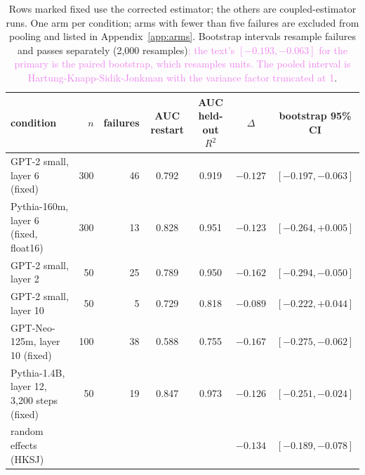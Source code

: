 \documentclass[10pt]{article}
\newcommand{\draft}[1]{\textcolor{violet}{#1}}
\begin{document}
\begin{table}[t]
\centering
\footnotesize
\setlength{\tabcolsep}{4pt}
\begin{tabular}{lrrcccc}
\toprule
condition & $n$ & failures & AUC restart & AUC held-out $R^2$ & $\Delta$ & bootstrap 95\% CI \\
\midrule
GPT-2 small, layer 6 (fixed) & 300 & 46 & 0.792 & 0.919 & $-0.127$ & $[-0.197, -0.063]$ \\
Pythia-160m, layer 6 (fixed, float16) & 300 & 13 & 0.828 & 0.951 & $-0.123$ & $[-0.264, +0.005]$ \\
GPT-2 small, layer 2 & 50 & 25 & 0.789 & 0.950 & $-0.162$ & $[-0.294, -0.050]$ \\
GPT-2 small, layer 10 & 50 & 5 & 0.729 & 0.818 & $-0.089$ & $[-0.222, +0.044]$ \\
GPT-Neo-125m, layer 10 (fixed) & 100 & 38 & 0.588 & 0.755 & $-0.167$ & $[-0.275, -0.062]$ \\
Pythia-1.4B, layer 12, 3{,}200 steps (fixed) & 50 & 19 & 0.847 & 0.973 & $-0.126$ & $[-0.251, -0.024]$ \\
\midrule
random effects (HKSJ) & & & & & $-0.134$ & $[-0.189, -0.078]$ \\
\bottomrule
\end{tabular}
\caption{Rows marked fixed use the corrected estimator; the others are coupled-estimator runs.
One arm per condition; arms with fewer than five failures are excluded from pooling and listed
in Appendix~\ref{app:arms}. Bootstrap intervals resample failures and passes separately
(2{,}000 resamples)\draft{; the text's $[-0.193, -0.063]$ for the primary is the paired
bootstrap, which resamples units. The pooled interval is Hartung-Knapp-Sidik-Jonkman with the
variance factor truncated at 1}.}
\label{tab:arms}
\end{table}
\end{document}
